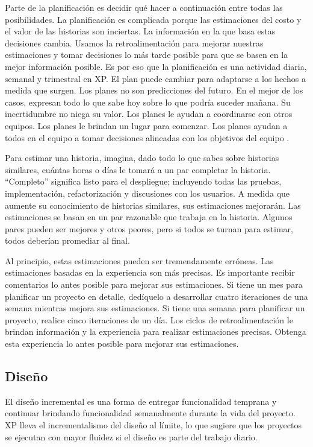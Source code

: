 \begin{spacing}{1.5}
				Parte de la planificación es decidir qué hacer a continuación entre todas las posibilidades. La planificación es complicada porque las estimaciones del costo y el valor de las historias son inciertas. La información en la que basa estas decisiones cambia. Usamos la retroalimentación para mejorar nuestras estimaciones y tomar decisiones lo más tarde posible para que se basen en la mejor información posible. Es por eso que la planificación es una actividad diaria, semanal y trimestral en XP. El plan puede cambiar para adaptarse a los hechos a medida que surgen.
				Los planes no son predicciones del futuro. En el mejor de los casos, expresan todo lo que sabe hoy sobre lo que podría suceder mañana. Su incertidumbre no niega su valor. Los planes le ayudan a coordinarse con otros equipos. Los planes le brindan un lugar para comenzar. Los planes ayudan a todos en el equipo a tomar decisiones alineadas con los objetivos del equipo \cite{chap2_extreme_programming}.
				
				Para estimar una historia, imagina, dado todo lo que sabes sobre historias similares, cuántas horas o días le tomará a un par completar la historia. “Completo” significa listo para el despliegue; incluyendo todas las pruebas, implementación, refactorización y discusiones con los usuarios. A medida que aumente su conocimiento de historias similares, sus estimaciones mejorarán. Las estimaciones se basan en un par razonable que trabaja en la historia. Algunos pares pueden ser mejores y otros peores, pero si todos se turnan para estimar, todos deberían promediar al final.
				
				Al principio, estas estimaciones pueden ser tremendamente erróneas. Las estimaciones basadas en la experiencia son más precisas. Es importante recibir comentarios lo antes posible para mejorar sus estimaciones. Si tiene un mes para planificar un proyecto en detalle, dedíquelo a desarrollar cuatro iteraciones de una semana mientras mejora sus estimaciones. Si tiene una semana para planificar un proyecto, realice cinco iteraciones de un día. Los ciclos de retroalimentación le brindan información y la experiencia para realizar estimaciones precisas. Obtenga esta experiencia lo antes posible para mejorar sus estimaciones.
	\subsection{Diseño}
				El diseño incremental es una forma de entregar funcionalidad temprana y continuar brindando funcionalidad semanalmente durante la vida del proyecto. XP lleva el incrementalismo del diseño al límite, lo que sugiere que los proyectos se ejecutan con mayor fluidez si el diseño es parte del trabajo diario.
				

\end{spacing}
